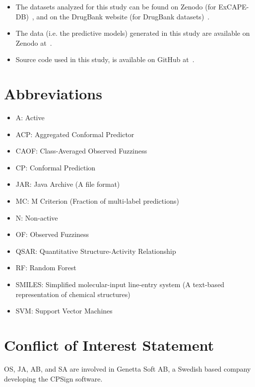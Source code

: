 \documentclass[utf8]{frontiersSCNS} %
\begin{document}
\begin{itemize}
    \item The datasets analyzed for this study can be found on Zenodo (for
        ExCAPE-DB)~\cite{ExcapeDBZenodo}, and on the DrugBank website (for
        DrugBank datasets)~\cite{DrugBankWebsite}.
    \item The data (i.e. the predictive models) generated in this study are
        available on Zenodo at~\cite{ModelsZenodo}.
    \item Source code used in this study, is available on GitHub
        at~\cite{PTPGitHub}.
\end{itemize}

\newpage

\section{Abbreviations} \label{Abbreviations}

\begin{itemize}
    \item A: Active
    \item ACP: Aggregated Conformal Predictor
    \item CAOF: Class-Averaged Observed Fuzziness
    \item CP: Conformal Prediction
    \item JAR: Java Archive (A file format)
    \item MC: M Criterion (Fraction of multi-label predictions)
    \item N: Non-active
    \item OF: Observed Fuzziness
    \item QSAR: Quantitative Structure-Activity Relationship
    \item RF: Random Forest
    \item SMILES: Simplified molecular-input line-entry system (A text-based representation of chemical structures)
    \item SVM: Support Vector Machines
\end{itemize}


\section{Conflict of Interest Statement}
OS, JA, AB, and SA are involved in Genetta Soft AB, a Swedish based company
developing the CPSign software.
\end{document}
